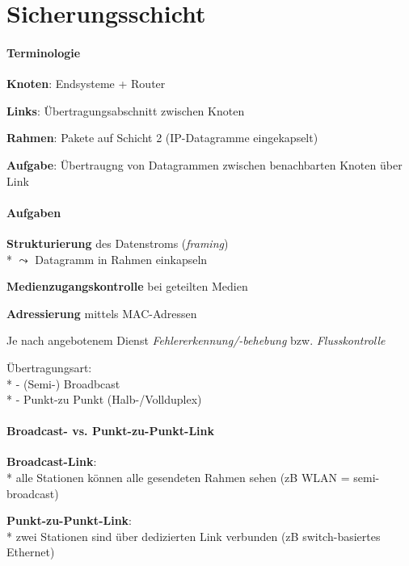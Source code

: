 \section{Sicherungsschicht}

\paragraph{Terminologie}
\begin{items}
  \item \textbf{Knoten}: Endsysteme + Router
  \item \textbf{Links}: Übertragungsabschnitt zwischen Knoten
  \item \textbf{Rahmen}: Pakete auf Schicht 2 (IP-Datagramme eingekapselt)
  \item \textbf{Aufgabe}: Übertraugng von Datagrammen zwischen benachbarten Knoten über Link
\end{items}

\paragraph{Aufgaben}
\begin{items}
  \item \textbf{Strukturierung} des Datenstroms (\emph{framing}) \\*
    \( \leadsto \) Datagramm in Rahmen einkapseln
  \item \textbf{Medienzugangskontrolle} bei geteilten Medien
  \item \textbf{Adressierung} mittels MAC-Adressen
  \item Je nach angebotenem Dienst \emph{Fehlererkennung/-behebung} bzw. \emph{Flusskontrolle}
  \item Übertragungsart: \\*
    - (Semi-) Broadbcast \\*
    - Punkt-zu Punkt (Halb-/Vollduplex)
\end{items}

\paragraph{Broadcast- vs. Punkt-zu-Punkt-Link}
\begin{items}
  \item \textbf{Broadcast-Link}: \\*
    alle Stationen können alle gesendeten Rahmen sehen (zB WLAN = semi-broadcast)
  \item \textbf{Punkt-zu-Punkt-Link}: \\*
    zwei Stationen sind über dedizierten Link verbunden (zB switch-basiertes Ethernet)
\end{items}

